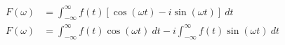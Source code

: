 \documentclass[preview]{standalone}
\begin{document}
\begin{align*}
F(\omega)&=\int_{-\infty}^{\infty}f(t)[\cos({\omega t})-i\sin({\omega t})] \ dt \\ F(\omega)&=\int_{-\infty}^{\infty}f(t)\cos({\omega t}) \ dt-i\int_{-\infty}^{\infty}f(t)\sin({\omega t}) \ dt
\end{align*}
\end{document}

